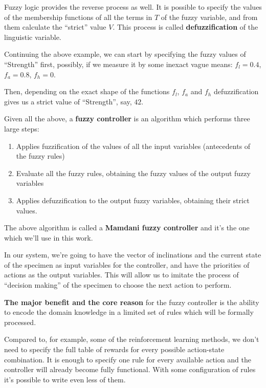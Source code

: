 \documentclass[11pt, a4paper]{article}
\begin{document}
  Fuzzy logic provides the reverse process as well.
  It is possible to specify the values of the membership functions of all the terms in $T$ of the fuzzy variable, and from them calculate the ``strict'' value $V$.
  This process is called \textbf{defuzzification} of the linguistic variable.

  Continuing the above example, we can start by specifying the fuzzy values of ``Strength'' first, possibly, if we measure it by some inexact vague means:
  $f_l = 0.4$, $f_a = 0.8$, $f_h = 0$.

  Then, depending on the exact shape of the functions $f_l$, $f_a$ and $f_h$ defuzzification gives us a strict value of ``Strength'', say, $42$.

  Given all the above, a \textbf{fuzzy controller} is an algorithm which performs three large steps:

  \begin{enumerate}
    \item Applies fuzzification of the values of all the input variables (antecedents of the fuzzy rules)
    \item Evaluate all the fuzzy rules, obtaining the fuzzy values of the output fuzzy variables
    \item Applies defuzzification to the output fuzzy variables, obtaining their strict values.
  \end{enumerate}

  The above algorithm is called a \textbf{Mamdani fuzzy controller} and it's the one which we'll use in this work.

  In our system, we're going to have the vector of inclinations and the current state of the specimen as input variables for the controller,
  and have the priorities of actions as the output variables.
  This will allow us to imitate the process of ``decision making'' of the specimen to choose the next action to perform.

	\textbf{The major benefit and the core reason} for the fuzzy controller is the ability to encode the domain knowledge in a limited set of rules which will be formally processed.

	Compared to, for example, some of the reinforcement learning methods, we don't need to specify the full table of rewards for every possible action-state combination.
	It is enough to specify one rule for every available action and the controller will already become fully functional.
	With some configuration of rules it's possible to write even less of them.
\end{document}
